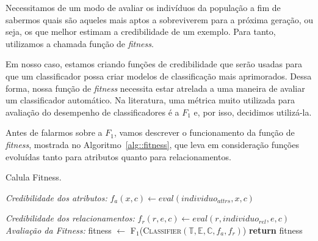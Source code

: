 Necessitamos de um modo de avaliar os indivíduos da população a fim de sabermos quais são aqueles mais aptos a sobreviverem para a próxima geração, ou seja, os que melhor estimam a credibilidade de um exemplo.
Para tanto, utilizamos a chamada função de \textit{fitness}.

Em nosso caso, estamos criando funções de credibilidade que serão usadas para que um classificador possa criar modelos de classificação mais aprimorados.
Dessa forma, nossa função de \textit{fitness} necessita estar atrelada a uma maneira de avaliar um classificador automático.
Na literatura, uma métrica muito utilizada para avaliação do desempenho de classificadores é a $F_1$ e, por isso, decidimos utilizá-la.

Antes de falarmos sobre a $F_1$, vamos descrever o funcionamento da função de \textit{fitness}, mostrada no Algoritmo~\ref{alg::fitness}, que leva em consideração funções evoluídas tanto para atributos quanto para relacionamentos.

\algrenewcommand{}
\algrenewcommand{}
\algrenewcommand{}
\algrenewcommand{}

\begin{algorithm}
\centering
\caption{Calula Fitness.}
\label{alg::fitness}
\begin{algorithmic}[!h]
{
{}
  \State
  \State \textit{Credibilidade dos atributos:}
      \State $f_a(x,c) \gets eval(individuo_{attrs}, x, c)$
    \EndFor
  \EndFor
  \EndIf
  \State

  \State \textit{Credibilidade dos relacionamentos:}
            \State $f_r(r,e,c) \gets eval(r,individuo_{rel}, e, c)$
        \EndFor
    \EndFor
  \EndFor
  \EndIf
  \State
  \State \textit{Avaliação da Fitness:}
  \State fitness $\gets$ \textsc{F$_1$}(\textsc{Classifier}$(\mathbb{T}, \mathbb{E}, \mathbb{C}, f_a, f_r)$)
  \State \textbf{return} fitness
\EndFunction
}
\end{algorithmic}
\end{algorithm}

